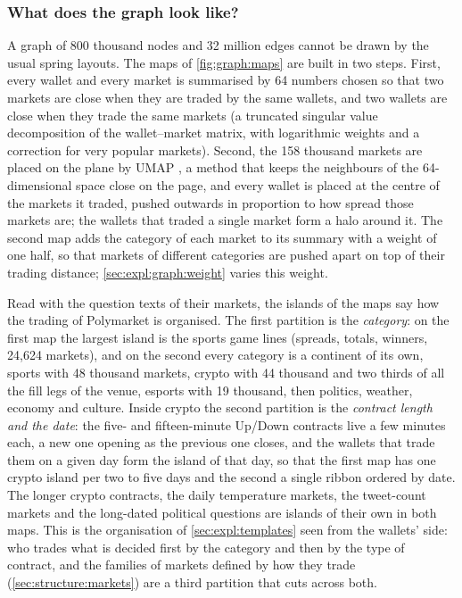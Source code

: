 \subsubsection{What does the graph look like?}
\label{sec:expl:graph:map}

A graph of 800 thousand nodes and 32 million edges cannot be drawn by the usual spring
layouts.  The maps of \cref{fig:graph:maps} are built in two steps.  First, every wallet
and every market is summarised by 64 numbers chosen so that two markets are close when
they are traded by the same wallets, and two wallets are close when they trade the same
markets (a truncated singular value decomposition of the wallet--market matrix, with
logarithmic weights and a correction for very popular markets).  Second, the 158 thousand
markets are placed on the plane by UMAP \cite{mcinnes2018umap}, a method that keeps the
neighbours of the 64-dimensional space close on the page, and every wallet is placed at
the centre of the markets it traded, pushed outwards in proportion to how spread those
markets are; the wallets that traded a single market form a halo around it.  The second
map adds the category of each market to its summary with a weight of one half, so that
markets of different categories are pushed apart on top of their trading distance;
\cref{sec:expl:graph:weight} varies this weight.

Read with the question texts of their markets, the islands of the maps say how the
trading of Polymarket is organised.  The first partition is the \emph{category}: on the
first map the largest island is the sports game lines (spreads, totals, winners, 24{,}624
markets), and on the second every category is a continent of its own, sports with 48
thousand markets, crypto with 44 thousand and two thirds of all the fill legs of the
venue, esports with 19 thousand, then politics, weather, economy and culture.  Inside
crypto the second partition is the \emph{contract length and the date}: the five- and
fifteen-minute Up/Down contracts live a few minutes each, a new one opening as the
previous one closes, and the wallets that trade them on a given day form the island of
that day, so that the first map has one crypto island per two to five days and the second
a single ribbon ordered by date.  The longer crypto contracts, the daily temperature
markets, the tweet-count markets and the long-dated political questions are islands of
their own in both maps.  This is the organisation of \cref{sec:expl:templates} seen from
the wallets' side: who trades what is decided first by the category and then by the type
of contract, and the families of markets defined by how they trade
(\cref{sec:structure:markets}) are a third partition that cuts across both.

